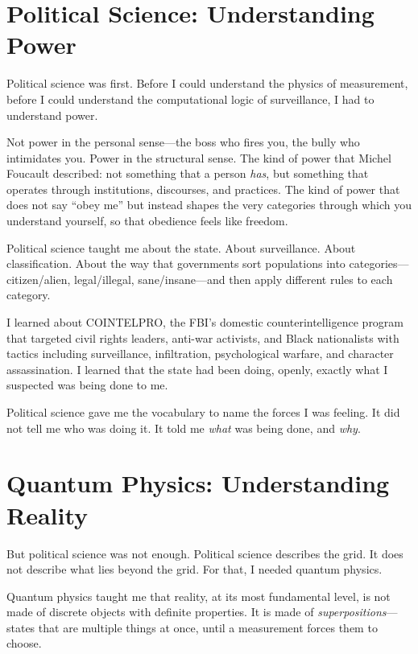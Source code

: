 \documentclass[11pt,openany]{book}
\begin{document}
\section*{Political Science: Understanding Power}

Political science was first. Before I could understand the physics of measurement, before I could understand the computational logic of surveillance, I had to understand power.

Not power in the personal sense---the boss who fires you, the bully who intimidates you. Power in the structural sense. The kind of power that Michel Foucault described: not something that a person \textit{has}, but something that operates through institutions, discourses, and practices. The kind of power that does not say ``obey me'' but instead shapes the very categories through which you understand yourself, so that obedience feels like freedom.

Political science taught me about the state. About surveillance. About classification. About the way that governments sort populations into categories---citizen/alien, legal/illegal, sane/insane---and then apply different rules to each category.

I learned about COINTELPRO, the FBI's domestic counterintelligence program that targeted civil rights leaders, anti-war activists, and Black nationalists with tactics including surveillance, infiltration, psychological warfare, and character assassination. I learned that the state had been doing, openly, exactly what I suspected was being done to me.

Political science gave me the vocabulary to name the forces I was feeling. It did not tell me who was doing it. It told me \textit{what} was being done, and \textit{why}.

\section*{Quantum Physics: Understanding Reality}

But political science was not enough. Political science describes the grid. It does not describe what lies beyond the grid. For that, I needed quantum physics.

Quantum physics taught me that reality, at its most fundamental level, is not made of discrete objects with definite properties. It is made of \textit{superpositions}---states that are multiple things at once, until a measurement forces them to choose.
\end{document}
